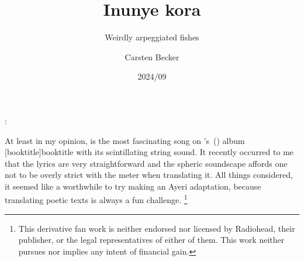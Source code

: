 \documentclass[12pt,paper=a4]{scrartcl}
\author{Carsten Becker}
\title{Inunye kora}
\subtitle{Weirdly arpeggiated fishes}
\date{2024/09} %
\newenvironment{mytitle}{
	\hfill
	\begin{minipage}{0.667\textwidth}
	\vspace{\baselineskip}
	\begin{center}
		\Large
		\sffamily\bfseries
		\makeatletter
}{
		\makeatother
	\end{center}
	\vspace{1em}
	\end{minipage}
	\hfill
}
\begin{document}

\begin{mytitle}
	\@title: \@subtitle
\end{mytitle}

At least in my opinion,  is the most
fascinating song on
\citeauthor{radiohead:weirdfishes}'s~(\citeyear{radiohead:weirdfishes}) album
[booktitle]{booktitle} with its
scintillating string sound. It recently occurred to me that the lyrics are very
straightforward and the spheric soundscape affords one not to be overly strict
with the meter when translating it. All things considered, it seemed like a
worthwhile to try making an Ayeri adaptation, because translating poetic texts
is always a fun challenge.%
%
	\footnote{This derivative fan work is neither endorsed nor licensed by
	Radiohead, their publisher, or the legal representatives of either of them.
	This work neither pursues nor implies any intent of financial gain.}
\end{document}
